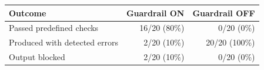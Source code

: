 \begin{tabular}{lrr}
\hline
Outcome & Guardrail ON & Guardrail OFF \\
\hline
Passed predefined checks & 16/20 (80\%) & 0/20 (0\%) \\
Produced with detected errors & 2/20 (10\%) & 20/20 (100\%) \\
Output blocked & 2/20 (10\%) & 0/20 (0\%) \\
\hline
\end{tabular}
